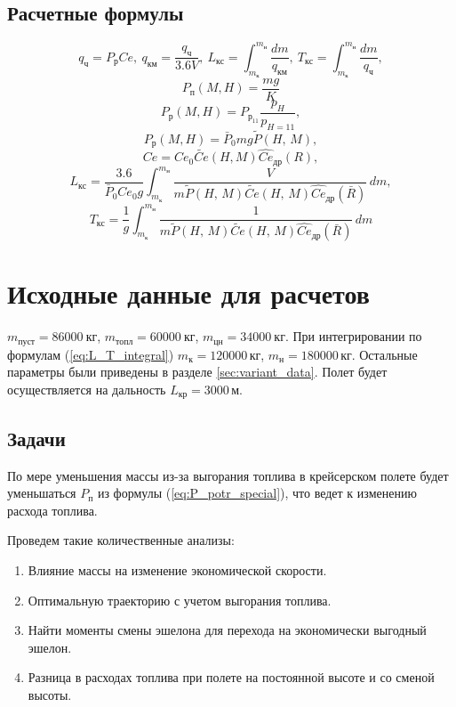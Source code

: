 \subsection{Расчетные формулы} 
\begin{equation}
\label{eq:L_T_integral}
q_{ч}=P_{р} Ce, \: q_{км}=\frac{q_{ч}}{3.6 V}, \: L_{кс}= \int_{m_к}^{m_н} \frac{dm}{q_{км}},\: T_{кс}= \int_{m_к}^{m_н} \frac{dm}{q_{ч}},
\end{equation}
\begin{equation}
    P_п(M, H)= \frac{mg}{K} 
    \label{eq:P_potr_special}
\end{equation}
\begin{equation}
    P_р(M, H)= P_{р_{11}} \frac{p_H}{p_{H=11}},
\end{equation}
\begin{equation}
    P_р(M, H) = \bar{P}_0 m g \tilde{P}(H,\, M),
\end{equation}
\begin{equation}
Ce = Ce_0 \tilde{Ce}(H,M) \hat{Ce}_{др}(R),
\end{equation}
\begin{equation}
    L_{кс}= \frac{3.6}{\bar{P}_0 Ce_0g} \int_{m_к}^{m_н} \frac{V}{m
    \tilde{P}(H,\,M) \tilde{Ce}(H,\, M) \hat{Ce}_{др}(\bar{R})}   \, dm,
\end{equation}
\begin{equation}
    T_{кс}= \frac{1}{g} \int_{m_к}^{m_н} \frac{1}{m \tilde{P}(H,\,M)
\tilde{Ce}(H,\, M) \hat{Ce}_{др}(\bar{R})}\, dm
\end{equation}

\section{Исходные данные для расчетов}

$m_{пуст} = 86000\ \text{кг}$, $m_{топл}= 60000\ \text{кг}$, $m_{цн}=34000\ \text{кг}$.
При интегрировании по формулам (\ref{eq:L_T_integral}) $m_{к}=120000\, кг$, $m_{н}=180000\, кг$.
Остальные параметры были приведены в разделе \ref{sec:variant_data}. Полет
будет осуществляется на дальность $L_{кр} = 3000 \, м$.

\subsection{Задачи}
По мере уменьшения массы из-за выгорания топлива в крейсерском полете будет
уменьшаться $P_п$ из формулы (\ref{eq:P_potr_special}), что ведет к изменению расхода
топлива.  

Проведем такие количественные анализы:  

\begin{enumerate}
    \item Влияние массы на изменение экономической скорости.
    \item Оптимальную траекторию с учетом выгорания топлива.
    \item Найти моменты смены эшелона для перехода на экономически выгодный эшелон. 
    \item Разница в расходах топлива при полете на постоянной высоте и со сменой высоты.
\end{enumerate}

